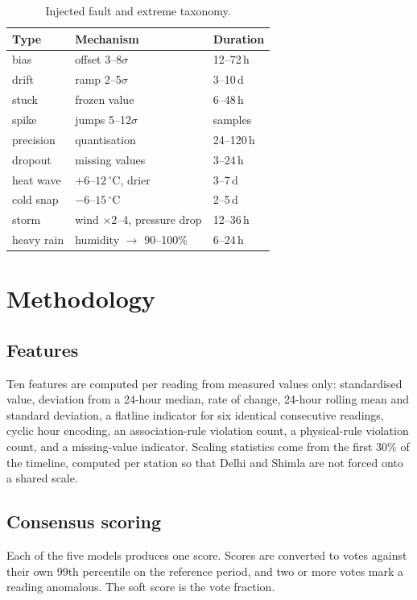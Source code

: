 \documentclass[conference]{IEEEtran}
\begin{document}
\begin{table}[ht]
\centering
\caption{Injected fault and extreme taxonomy.}
\label{tab:taxonomy}
\begin{tabular}{lll}
\toprule
Type & Mechanism & Duration \\
\midrule
bias & offset 3--8$\sigma$ & 12--72\,h \\
drift & ramp 2--5$\sigma$ & 3--10\,d \\
stuck & frozen value & 6--48\,h \\
spike & jumps 5--12$\sigma$ & samples \\
precision & quantisation & 24--120\,h \\
dropout & missing values & 3--24\,h \\
\midrule
heat wave & $+6$--$12\,^\circ$C, drier & 3--7\,d \\
cold snap & $-6$--$15\,^\circ$C & 2--5\,d \\
storm & wind $\times2$--4, pressure drop & 12--36\,h \\
heavy rain & humidity $\to$ 90--100\% & 6--24\,h \\
\bottomrule
\end{tabular}
\end{table}

\section{Methodology}
\subsection{Features}
Ten features are computed per reading from measured values only: standardised value, deviation from a
24-hour median, rate of change, 24-hour rolling mean and standard deviation, a flatline indicator for
six identical consecutive readings, cyclic hour encoding, an association-rule violation count, a
physical-rule violation count, and a missing-value indicator. Scaling statistics come from the first
30\% of the timeline, computed per station so that Delhi and Shimla are not forced onto a shared
scale.

\subsection{Consensus scoring}
Each of the five models produces one score. Scores are converted to votes against their own 99th
percentile on the reference period, and two or more votes mark a reading anomalous. The soft score is
the vote fraction.
\end{document}
